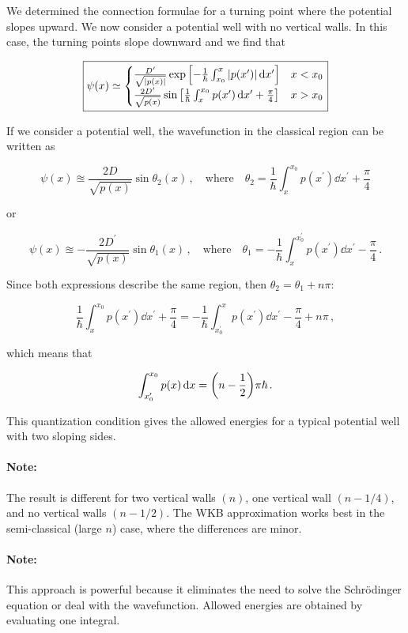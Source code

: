 \documentclass[12pt, titlepage]{article}
\begin{document}
We determined the connection formulae for a turning point where the potential slopes upward. We now consider a potential well with no vertical walls. In this case, the turning points slope downward and we find that

\begin{equation}
\boxed{\psi(x)\simeq \begin{cases}
	\frac{D^\prime}{\sqrt{|p(x)|}}\exp\qty[-\frac{1}{\hbar}\int_{x_0}^{x}|p(x^\prime)|\dd{x^\prime}] & x<x_0 \\
	\frac{2D^\prime}{\sqrt{p(x)}}\sin\qty[\frac{1}{\hbar}\int_{x}^{x_0}p(x^\prime) \dd{x^\prime} + \frac{\pi}{4}] & x > x_0 
	\end{cases}}
\end{equation} 

If we consider a potential well, the wavefunction in the classical region can be written as 

\begin{equation}
	\psi(x)\approxeq \frac{2D}{\sqrt{p(x)}}\sin\theta_2(x) \,, \quad\text{where}\quad \theta_2 = \frac{1}{\hbar}\int_{x}^{x_0}p(x^\prime)\dd{x^\prime} + \frac{\pi}{4}
\end{equation}

or 

\begin{equation}
	\psi(x)\approxeq -\frac{2D^\prime}{\sqrt{p(x)}}\sin\theta_1(x) \,, \quad\text{where}\quad \theta_1 = -\frac{1}{\hbar}\int_{x}^{x_0^\prime}p(x^\prime)\dd{x^\prime} - \frac{\pi}{4} \,.
\end{equation}

Since both expressions describe the same region, then $\theta_2 = \theta_1 + n\pi$:

\begin{equation*}
	\frac{1}{\hbar}\int_{x}^{x_0}p(x^\prime)\dd{x^\prime} + \frac{\pi}{4} = -\frac{1}{\hbar}\int_{x_0^\prime}^{x}p(x^\prime)\dd{x^\prime} - \frac{\pi}{4} + n\pi \,,
\end{equation*}

which means that

\begin{equation}
	\int_{x_0^\prime}^{x_0}p(x)\dd{x} = \qty(n-\frac{1}{2})\pi\hbar \,.
\end{equation}

This quantization condition gives the allowed energies for a typical potential well with two sloping sides. 

\begin{mdframed}
\paragraph*{Note:}
The result is different for two vertical walls $(n)$, one vertical wall $(n-1/4)$, and no vertical walls $(n-1/2)$. The WKB approximation works best in the semi-classical (large $n$) case, where the differences are minor.
\end{mdframed}

\begin{mdframed}
\paragraph*{Note:}
This approach is powerful because it eliminates the need to solve the Schrödinger equation or deal with the wavefunction. Allowed energies are obtained by evaluating one integral. 
\end{mdframed}
\end{document}
